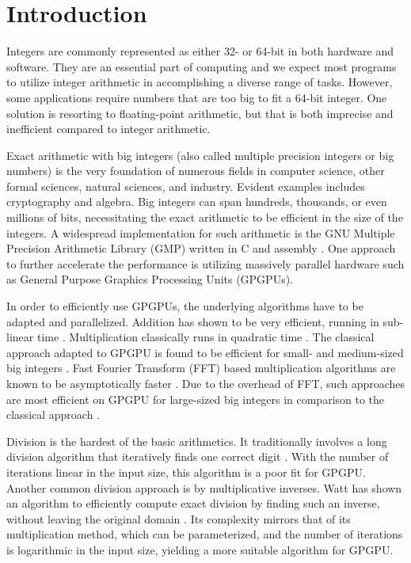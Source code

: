 \section{Introduction}
\label{sec:intro}

Integers are commonly represented as either 32- or 64-bit in both hardware and
software. They are an essential part of computing and we expect most programs to
utilize integer arithmetic in accomplishing a diverse range of tasks. However,
some applications require numbers that are too big to fit a 64-bit integer. One
solution is resorting to floating-point arithmetic, but that is both imprecise
and inefficient compared to integer arithmetic.

Exact arithmetic with big integers (also called multiple precision integers or
big numbers) is the very foundation of numerous fields in computer science,
other formal sciences, natural sciences, and industry. Evident examples includes
cryptography and algebra. Big integers can span hundreds, thousands, or even
millions of bits, necessitating the exact arithmetic to be efficient in the size
of the integers. A widespread implementation for such arithmetic is the GNU
Multiple Precision Arithmetic Library (GMP) written in C and assembly
\cite{GMP}. One approach to further accelerate the performance is utilizing
massively parallel hardware such as General Purpose Graphics Processing Units
(GPGPUs).

In order to efficiently use GPGPUs, the underlying algorithms have to be adapted
and parallelized. Addition has shown to be very efficient, running in sub-linear
time \cite{DPPproject,blellochaddscan}. Multiplication classically runs in
quadratic time \cite{knuth97}. The classical approach adapted to GPGPU is found
to be efficient for small- and medium-sized big integers
\cite{doi:10.1177/10943420221077964, oancea2024gpu}. Fast Fourier Transform
(FFT) based multiplication algorithms are known to be asymptotically faster
\cite{knuth97}. Due to the overhead of FFT, such approaches are most efficient
on GPGPU for large-sized big integers in comparison to the classical approach
\cite{Bantikyan2014BigIM, doi:10.1177/10943420221077964, oancea2024gpu}.

Division is the hardest of the basic arithmetics. It traditionally involves a
long division algorithm that iteratively finds one correct digit
\cite{knuth97}. With the number of iterations linear in the input size, this
algorithm is a poor fit for GPGPU. Another common division approach is by
multiplicative inverses. Watt has shown an algorithm to efficiently compute
exact division by finding such an inverse, without leaving the original domain
\cite{watt2023efficient}. Its complexity mirrors that of its multiplication
method, which can be parameterized, and the number of iterations is logarithmic
in the input size, yielding a more suitable algorithm for GPGPU. \bigskip

